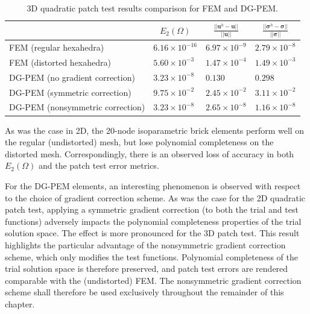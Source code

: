 \begin{table}[!ht]
  \begin{center}
    \begin{tabular}{| l || l | l | l |}
    \hline
           & \multicolumn{1}{|c|}{$E_2 (\Omega)$} & \multicolumn{1}{|c|}{$\frac{||\bm{u}^h - \bm{u}||}{||\bm{u}||}$} & \multicolumn{1}{|c|}{$\frac{||\boldsymbol{\sigma}^h - \boldsymbol{\sigma}||}{||\boldsymbol{\sigma}||}$} \\ \hline \hline
    FEM (regular hexahedra) & $6.16 \times 10^{-16}$ & $6.97 \times 10^{-9}$ & $2.79 \times 10^{-8}$ \\ \hline
    FEM (distorted hexahedra) & $5.60 \times 10^{-3}$ & $1.47 \times 10^{-4}$ & $1.49 \times 10^{-3}$ \\ \hline
    DG-PEM (no gradient correction) & $3.23 \times 10^{-8}$ & $0.130$ & $0.298$ \\ \hline
    DG-PEM (symmetric correction) & $9.75 \times 10^{-2}$ & $2.45 \times 10^{-2}$ & $3.11 \times 10^{-2}$ \\ \hline
    DG-PEM (nonsymmetric correction) & $3.23 \times 10^{-8}$ & $2.65 \times 10^{-8}$ & $1.16 \times 10^{-8}$ \\
    \hline
    \end{tabular}
    \caption{3D quadratic patch test results comparison for FEM and DG-PEM.}
    \vspace{-5pt}
    \label{tab:quadratic_patch_test_3d}
    \vspace{-10pt}
  \end{center}
\end{table}

As was the case in 2D, the 20-node isoparametric brick elements perform well on the regular (undistorted) mesh, but lose polynomial completeness on the distorted mesh. Correspondingly, there is an observed loss of accuracy in both $E_2 (\Omega)$ and the patch test error metrics.

For the DG-PEM elements, an interesting phenomenon is observed with respect to the choice of gradient correction scheme. As was the case for the 2D quadratic patch test, applying a symmetric gradient correction (to both the trial and test functions) adversely impacts the polynomial completeness properties of the trial solution space. The effect is more pronounced for the 3D patch test. This result highlights the particular advantage of the nonsymmetric gradient correction scheme, which only modifies the test functions. Polynomial completeness of the trial solution space is therefore preserved, and patch test errors are rendered comparable with the (undistorted) FEM. The nonsymmetric gradient correction scheme shall therefore be used exclusively throughout the remainder of this chapter.


